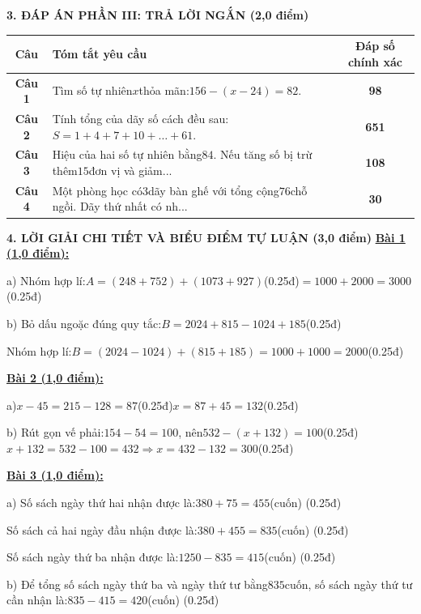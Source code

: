 \documentclass[11pt,a4paper]{article}
\begin{document}
\noindent\textbf{\large 3. ĐÁP ÁN PHẦN III: TRẢ LỜI NGẮN (2,0 điểm)}
\vspace{4pt}
\begin{center}
\begin{tabular}{|c|m{11cm}|c|}
\hline
\textbf{Câu} & \textbf{Tóm tắt yêu cầu} & \textbf{Đáp số chính xác} \\
\hline
\textbf{Câu 1} & Tìm số tự nhiên$x$thỏa mãn:$156 - (x - 24) = 82$. & \textbf{98} \\
\hline
\textbf{Câu 2} & Tính tổng của dãy số cách đều sau:$S = 1 + 4 + 7 + 10 + \dots + 61$. & \textbf{651} \\
\hline
\textbf{Câu 3} & Hiệu của hai số tự nhiên bằng$84$. Nếu tăng số bị trừ thêm$15$đơn vị và giảm... & \textbf{108} \\
\hline
\textbf{Câu 4} & Một phòng học có$3$dãy bàn ghế với tổng cộng$76$chỗ ngồi. Dãy thứ nhất có nh... & \textbf{30} \\
\hline
\end{tabular}
\end{center}
\vspace{6pt}


\noindent\textbf{\large 4. LỜI GIẢI CHI TIẾT VÀ BIỂU ĐIỂM TỰ LUẬN (3,0 điểm)}
\vspace{4pt}
\noindent\textbf{\underline{Bài 1 (1,0 điểm):}}\par\vspace{3pt}
a) Nhóm hợp lí:$A = (248 + 752) + (1073 + 927)$(0.25đ)$= 1000 + 2000 = 3000$(0.25đ)\par\noindent b) Bỏ dấu ngoặc đúng quy tắc:$B = 2024 + 815 - 1024 + 185$(0.25đ)\par\noindent Nhóm hợp lí:$B = (2024 - 1024) + (815 + 185) = 1000 + 1000 = 2000$(0.25đ)\par\vspace{8pt}

\noindent\textbf{\underline{Bài 2 (1,0 điểm):}}\par\vspace{3pt}
a)$x - 45 = 215 - 128 = 87$(0.25đ)$x = 87 + 45 = 132$(0.25đ)\par\noindent b) Rút gọn vế phải:$154 - 54 = 100$, nên$532 - (x + 132) = 100$(0.25đ)$x + 132 = 532 - 100 = 432 \Rightarrow x = 432 - 132 = 300$(0.25đ)\par\vspace{8pt}

\noindent\textbf{\underline{Bài 3 (1,0 điểm):}}\par\vspace{3pt}
a) Số sách ngày thứ hai nhận được là:$380 + 75 = 455$(cuốn) (0.25đ)\par\noindent Số sách cả hai ngày đầu nhận được là:$380 + 455 = 835$(cuốn) (0.25đ)\par\noindent Số sách ngày thứ ba nhận được là:$1250 - 835 = 415$(cuốn) (0.25đ)\par\noindent b) Để tổng số sách ngày thứ ba và ngày thứ tư bằng$835$cuốn, số sách ngày thứ tư cần nhận là:$835 - 415 = 420$(cuốn) (0.25đ)\par\vspace{8pt}
\end{document}
